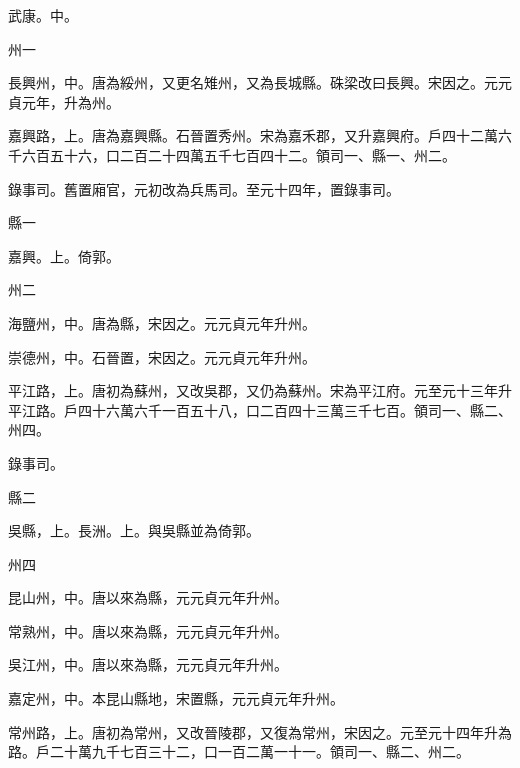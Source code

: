 \begin{pinyinscope}
 武康。中。



 州一



 長興州，中。唐為綏州，又更名雉州，又為長城縣。硃梁改曰長興。宋因之。元元貞元年，升為州。



 嘉興路，上。唐為嘉興縣。石晉置秀州。宋為嘉禾郡，又升嘉興府。戶四十二萬六千六百五十六，口二百二十四萬五千七百四十二。領司一、縣一、州二。



 錄事司。舊置廂官，元初改為兵馬司。至元十四年，置錄事司。



 縣一



 嘉興。上。倚郭。



 州二



 海鹽州，中。唐為縣，宋因之。元元貞元年升州。



 崇德州，中。石晉置，宋因之。元元貞元年升州。



 平江路，上。唐初為蘇州，又改吳郡，又仍為蘇州。宋為平江府。元至元十三年升平江路。戶四十六萬六千一百五十八，口二百四十三萬三千七百。領司一、縣二、州四。



 錄事司。



 縣二



 吳縣，上。長洲。上。與吳縣並為倚郭。



 州四



 昆山州，中。唐以來為縣，元元貞元年升州。



 常熟州，中。唐以來為縣，元元貞元年升州。



 吳江州，中。唐以來為縣，元元貞元年升州。



 嘉定州，中。本昆山縣地，宋置縣，元元貞元年升州。



 常州路，上。唐初為常州，又改晉陵郡，又復為常州，宋因之。元至元十四年升為路。戶二十萬九千七百三十二，口一百二萬一十一。領司一、縣二、州二。




\end{pinyinscope}
